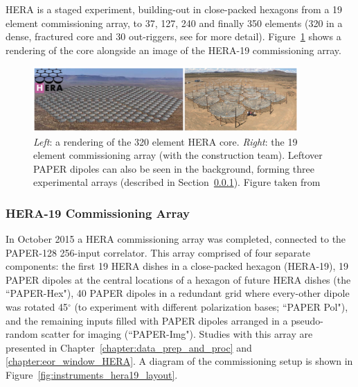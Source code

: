 HERA is a staged experiment, building-out in close-packed hexagons from a 19 element commissioning array, to 37, 127, 240 and finally 350 elements (320 in a dense, fractured core and 30 out-riggers, see \citealt{Dillon.16} for more detail). Figure~\ref{fig:instruments_hera_layout} shows a rendering of the core alongside an image of the HERA-19 commissioning array.

\begin{figure}
\centering
\includegraphics[width=0.9\textwidth]{chapters/instruments/figures/HERAlayout_deBoer.png}
\caption[Future vision and physical commissioning HERA layout.]{\textit{Left}: a rendering of the 320 element HERA core. \textit{Right}: the 19 element commissioning array (with the construction team). Leftover PAPER dipoles can also be seen in the background, forming three experimental arrays (described in Section~\ref{subsubsec:instruments_hera19}). Figure taken from \cite{deBoer.17}}
\label{fig:instruments_hera_layout}
\end{figure}

\subsubsection{HERA-19 Commissioning Array}
\label{subsubsec:instruments_hera19}

In October 2015 a HERA commissioning array was completed, connected to the PAPER-128 256-input correlator. This array comprised of four separate components: the first 19 HERA dishes in a close-packed hexagon (HERA-19), 19 PAPER dipoles at the central locations of a hexagon of future HERA dishes (the ``PAPER-Hex"), 40 PAPER dipoles in a redundant grid where every-other dipole was rotated 45$^{\circ}$ (to experiment with different polarization bases; ``PAPER Pol"), and the remaining inputs filled with PAPER dipoles arranged in a pseudo-random scatter for imaging (``PAPER-Img"). Studies with this array are presented in Chapter~\ref{chapter:data_prep_and_proc} and \ref{chapter:eor_window_HERA}. A diagram of the commissioning setup is shown in Figure~\ref{fig:instruments_hera19_layout}.

